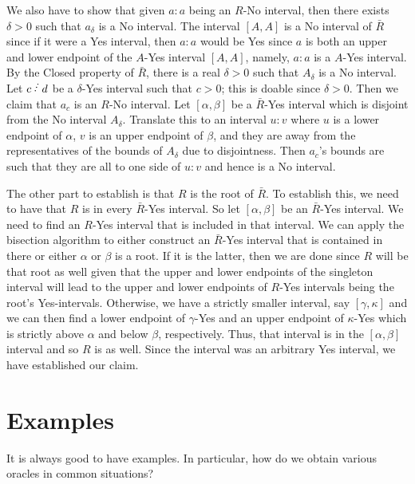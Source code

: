 \documentclass[12pt]{article}
\begin{document}
\begin{itemize}
    We also have to show that given $a:a$ being an $R$-No interval, then there exists $\delta>0$ such that $a_\delta$ is a No interval. The interval $[A,A]$ is a No interval of $\bar{R}$ since if it were a Yes interval, then $a:a$ would be Yes since $a$ is both an upper and lower endpoint of the $A$-Yes interval $[A,A]$, namely, $a:a$ is a $A$-Yes interval. By the Closed property of $\bar{R}$, there is a real $\delta > 0$ such that $A_\delta$ is a No interval. Let $c\lte d$ be a $\delta$-Yes interval such that $c > 0$; this is doable since $\delta >0$. Then we claim that $a_c$ is an $R$-No interval. Let $[\alpha, \beta]$ be a $\bar{R}$-Yes interval which is disjoint from the No interval $A_\delta$. Translate this to an interval $u:v$ where $u$ is a lower endpoint of $\alpha$, $v$ is an upper endpoint of $\beta$, and they are away from the representatives of the bounds of $A_\delta$ due to disjointness. Then $a_c$'s bounds are such that they are all to one side of $u:v$ and hence is a No interval. 
    

\end{itemize}

The other part to establish is that $R$ is the root of $\bar{R}$. To establish this, we need to have that $R$ is in every $\bar{R}$-Yes interval. So let $[\alpha, \beta]$ be an $\bar{R}$-Yes interval. We need to find an $R$-Yes interval that is included in that interval. We can apply the bisection algorithm to either construct an $\bar{R}$-Yes interval that is contained in there or either $\alpha$ or $\beta$ is a root. If it is the latter, then we are done since $R$ will be that root as well given that the upper and lower endpoints of the singleton interval will lead to the upper and lower endpoints of $R$-Yes intervals being the root's Yes-intervals. Otherwise, we have a strictly smaller interval, say $[\gamma, \kappa]$ and we can then find a lower endpoint of $\gamma$-Yes and an upper endpoint of $\kappa$-Yes which is strictly above $\alpha$ and below $\beta$, respectively. Thus, that interval is in the $[\alpha, \beta]$ interval and so $R$ is as well. Since the interval was an arbitrary Yes interval, we have established our claim. 




\section{Examples}

It is always good to have examples. In particular, how do we obtain various oracles in common situations? 
\end{document}
